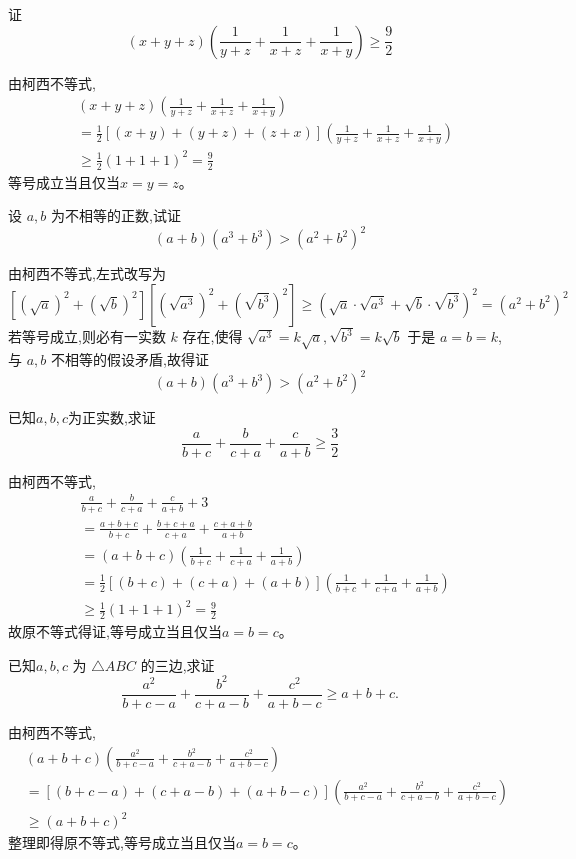 \begin{questions}
    \question 证 
    \[
    (x+y+z)(\frac{1}{y+z} + \frac{1}{x+z} + \frac{1}{x+y}) \ge \frac{9}{2}
    \]
    \begin{solution}
        由柯西不等式,
        \begin{align*}
        &(x+y+z)(\frac{1}{y+z} + \frac{1}{x+z} + \frac{1}{x+y})\\
        &= \frac{1}{2}[(x+y) + (y+z) + (z+x)](\frac{1}{y+z} + \frac{1}{x+z} + \frac{1}{x+y}) \\
        &\ge \frac{1}{2}(1+1+1)^2 = \frac{9}{2}
        \end{align*}
        等号成立当且仅当$x = y = z$。
    \end{solution}

    \question 设 $a, b$ 为不相等的正数,试证 
    \[
    (a+b)(a^3+b^3) > (a^2+b^2)^2
    \]
    \begin{solution}
        由柯西不等式,左式改写为
        \[
        [(\sqrt{a})^2 + (\sqrt{b})^2][(\sqrt{a^3})^2 + (\sqrt{b^3})^2] \ge (\sqrt{a} \cdot \sqrt{a^3} + \sqrt{b} \cdot \sqrt{b^3})^2 = (a^2 + b^2)^2
        \]
        若等号成立,则必有一实数 $k$ 存在,使得 $\sqrt{a^3} = k\sqrt{a}, \sqrt{b^3} = k\sqrt{b}$ 于是 $a=b=k$,与 $a, b$ 不相等的假设矛盾,故得证
        \[
        (a+b)(a^3+b^3) > (a^2+b^2)^2
        \]
    \end{solution}

    \question 已知$a, b, c$为正实数,求证
    \[
    \frac{a}{b+c} + \frac{b}{c+a} + \frac{c}{a+b} \ge \frac{3}{2}
    \]
    \begin{solution}
        由柯西不等式,
        \begin{align*}
        &\frac{a}{b+c} + \frac{b}{c+a} + \frac{c}{a+b} + 3 \\
        &= \frac{a+b+c}{b+c} + \frac{b+c+a}{c+a} + \frac{c+a+b}{a+b} \\
        &= (a+b+c)(\frac{1}{b+c} + \frac{1}{c+a} + \frac{1}{a+b}) \\
        &= \frac{1}{2}[(b+c) + (c+a) + (a+b)](\frac{1}{b+c} + \frac{1}{c+a} + \frac{1}{a+b}) \\
        &\ge \frac{1}{2}(1+1+1)^2 = \frac{9}{2}
        \end{align*}
        故原不等式得证,等号成立当且仅当$a=b=c$。
    \end{solution}

    \question 已知$a, b, c$ 为 $\triangle ABC$ 的三边,求证
    \[
    \frac{a^2}{b+c-a} + \frac{b^2}{c+a-b} + \frac{c^2}{a+b-c} \ge a+b+c.
    \] 
    \begin{solution}
        由柯西不等式, 
        \begin{align*}
        &(a+b+c)\left(\frac{a^2}{b+c-a} + \frac{b^2}{c+a-b} + \frac{c^2}{a+b-c}\right) \\
        &= [(b+c-a) + (c+a-b) + (a+b-c)]\left(\frac{a^2}{b+c-a} + \frac{b^2}{c+a-b} + \frac{c^2}{a+b-c}\right) \\
        &\ge (a+b+c)^2
        \end{align*}
        整理即得原不等式,等号成立当且仅当$a=b=c$。
    \end{solution}


\end{questions}
